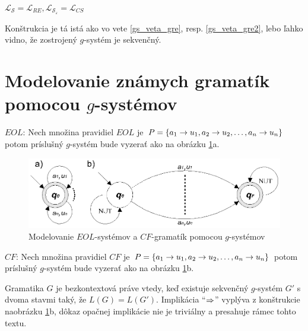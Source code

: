 \pagebreak

\begin{veta}\label{gs_veta_gsek}
$\mathcal{L}_{\mathcal{S}}=\mathcal{L}_{RE},
\mathcal{L}_{\mathcal{S}_\varepsilon}=\mathcal{L}_{CS}$
\end{veta}

\begin{dokaz}
Konštrukcia je tá istá ako vo vete \ref{gs_veta_gre}, resp.
\ref{gs_veta_gre2}, lebo ľahko vidno, že zostrojený $g$-systém je
sekvenčný.
\end{dokaz}

\section{Modelovanie známych gramatík pomocou $g$-systémov}

\begin{priklad}
\begin{description}
\item{$EOL$:} Nech množina pravidiel $EOL$ je $P=\{ a_1\rightarrow u_1,a_2\rightarrow u_2,\dots,a_n\rightarrow u_n\}$
potom príslušný $g$-systém bude vyzerať ako na obrázku
\ref{gs_obr_EOL_g}a.

\begin{figure}[!ht]
\centering
\includegraphics{img/gsystems/eol_g}
\caption{Modelovanie $EOL$-systémov a $CF$-gramatík pomocou $g$-systémov}
\label{gs_obr_EOL_g}
\end{figure}

\item{$CF$:} Nech množina pravidiel $CF$ je $P=\{a_1\rightarrow u_1, a_2\rightarrow u_2,\dots,a_n\rightarrow
u_n\}$ potom príslušný $g$-systém bude vyzerať ako na obrázku
\ref{gs_obr_EOL_g}b.
\end{description}
\end{priklad}

\begin{poznamka}
Gramatika $G$ je bezkontextová práve vtedy, keď existuje sekvenčný
$g$-systém $G'$ s dvoma stavmi taký, že $L(G)=L(G')$. Implikácia
``$\Rightarrow$'' vyplýva z konštrukcie na\linebreak obrázku \ref{gs_obr_EOL_g}b,
dôkaz opačnej implikácie nie je triviálny a presahuje rámec tohto
textu.
\end{poznamka}

